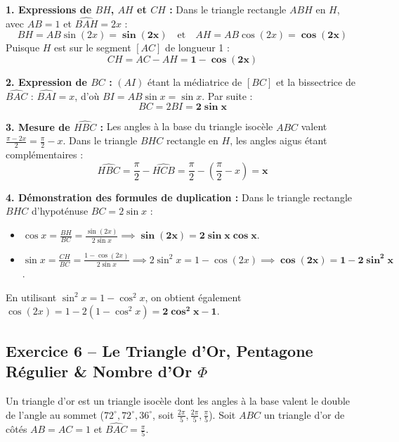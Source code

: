 \documentclass[11pt,a4paper]{article}
\begin{document}
\begin{correctionbox}
\textbf{1. Expressions de $BH$, $AH$ et $CH$ :}
Dans le triangle rectangle $ABH$ en $H$, avec $AB = 1$ et $\widehat{BAH} = 2x$ :
\[
BH = AB \sin(2x) = \mathbf{\sin(2x)} \quad \text{et} \quad AH = AB \cos(2x) = \mathbf{\cos(2x)}
\]
Puisque $H$ est sur le segment $[AC]$ de longueur 1 :
\[
CH = AC - AH = \mathbf{1 - \cos(2x)}
\]

\textbf{2. Expression de $BC$ :}
$(AI)$ étant la médiatrice de $[BC]$ et la bissectrice de $\widehat{BAC}$ :
$\widehat{BAI} = x$, d'où $BI = AB \sin x = \sin x$. Par suite :
\[
BC = 2 BI = \mathbf{2\sin x}
\]

\textbf{3. Mesure de $\widehat{HBC}$ :}
Les angles à la base du triangle isocèle $ABC$ valent $\frac{\pi - 2x}{2} = \frac{\pi}{2} - x$.
Dans le triangle $BHC$ rectangle en $H$, les angles aigus étant complémentaires :
\[
\widehat{HBC} = \frac{\pi}{2} - \widehat{HCB} = \frac{\pi}{2} - \left(\frac{\pi}{2} - x\right) = \mathbf{x}
\]

\textbf{4. Démonstration des formules de duplication :}
Dans le triangle rectangle $BHC$ d'hypoténuse $BC = 2\sin x$ :
\begin{itemize}[label=$\bullet$]
    \item $\cos x = \frac{BH}{BC} = \frac{\sin(2x)}{2\sin x} \implies \mathbf{\sin(2x) = 2\sin x \cos x}$.
    \item $\sin x = \frac{CH}{BC} = \frac{1 - \cos(2x)}{2\sin x} \implies 2\sin^2 x = 1 - \cos(2x) \implies \mathbf{\cos(2x) = 1 - 2\sin^2 x}$.
\end{itemize}
En utilisant $\sin^2 x = 1 - \cos^2 x$, on obtient également $\cos(2x) = 1 - 2(1 - \cos^2 x) = \mathbf{2\cos^2 x - 1}$.
\end{correctionbox}

\vspace{0.3cm}

\subsection*{Exercice 6 -- Le Triangle d'Or, Pentagone Régulier \& Nombre d'Or $\Phi$}

Un triangle d'or est un triangle isocèle dont les angles à la base valent le double de l'angle au sommet ($72^\circ, 72^\circ, 36^\circ$, soit $\frac{2\pi}{5}, \frac{2\pi}{5}, \frac{\pi}{5}$).
Soit $ABC$ un triangle d'or de côtés $AB = AC = 1$ et $\widehat{BAC} = \frac{\pi}{5}$.
\end{document}
